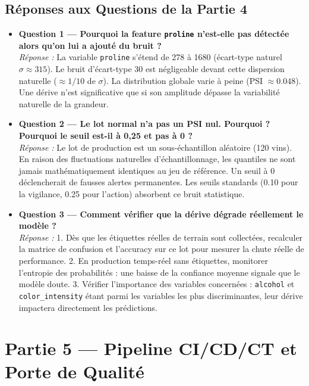 \documentclass[12pt,a4paper]{article}
\begin{document}
\subsection{Réponses aux Questions de la Partie 4}
\begin{itemize}[leftmargin=*]
  \item \textbf{Question 1 — Pourquoi la feature \texttt{proline} n'est-elle pas détectée alors qu'on lui a ajouté du bruit ?}\\
  \textit{Réponse :} La variable \texttt{proline} s'étend de 278 à 1680 (écart-type naturel $\sigma \approx 315$). Le bruit d'écart-type 30 est négligeable devant cette dispersion naturelle ($\approx 1/10$ de $\sigma$). La distribution globale varie à peine (PSI $\approx 0.048$). Une dérive n'est significative que si son amplitude dépasse la variabilité naturelle de la grandeur.

  \item \textbf{Question 2 — Le lot normal n'a pas un PSI nul. Pourquoi ? Pourquoi le seuil est-il à 0,25 et pas à 0 ?}\\
  \textit{Réponse :} Le lot de production est un sous-échantillon aléatoire (120 vins). En raison des fluctuations naturelles d'échantillonnage, les quantiles ne sont jamais mathématiquement identiques au jeu de référence. Un seuil à 0 déclencherait de fausses alertes permanentes. Les seuils standards (0.10 pour la vigilance, 0.25 pour l'action) absorbent ce bruit statistique.

  \item \textbf{Question 3 — Comment vérifier que la dérive dégrade réellement le modèle ?}\\
  \textit{Réponse :} 
  1. Dès que les étiquettes réelles de terrain sont collectées, recalculer la matrice de confusion et l'accuracy sur ce lot pour mesurer la chute réelle de performance.
  2. En production temps-réel sans étiquettes, monitorer l'entropie des probabilités : une baisse de la confiance moyenne signale que le modèle doute.
  3. Vérifier l'importance des variables concernées : \texttt{alcohol} et \texttt{color\_intensity} étant parmi les variables les plus discriminantes, leur dérive impactera directement les prédictions.
\end{itemize}

\newpage

\section{Partie 5 — Pipeline CI/CD/CT et Porte de Qualité}
\end{document}
